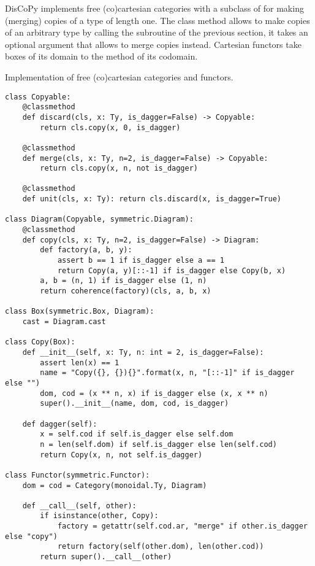 DisCoPy implements free (co)cartesian categories with a subclass of  for making (merging)  copies of a type  of length one.
The class method  allows to make  copies of an arbitrary type  by calling the  subroutine of the previous section, it takes an optional argument  that allows to merge copies instead.
Cartesian functors take  boxes of its domain to the  method of its codomain.

\begin{python}
{\normalfont Implementation of free (co)cartesian categories and functors.}

\begin{verbatim}
class Copyable:
    @classmethod
    def discard(cls, x: Ty, is_dagger=False) -> Copyable:
        return cls.copy(x, 0, is_dagger)

    @classmethod
    def merge(cls, x: Ty, n=2, is_dagger=False) -> Copyable:
        return cls.copy(x, n, not is_dagger)

    @classmethod
    def unit(cls, x: Ty): return cls.discard(x, is_dagger=True)

class Diagram(Copyable, symmetric.Diagram):
    @classmethod
    def copy(cls, x: Ty, n=2, is_dagger=False) -> Diagram:
        def factory(a, b, y):
            assert b == 1 if is_dagger else a == 1
            return Copy(a, y)[::-1] if is_dagger else Copy(b, x)
        a, b = (n, 1) if is_dagger else (1, n)
        return coherence(factory)(cls, a, b, x)

class Box(symmetric.Box, Diagram):
    cast = Diagram.cast

class Copy(Box):
    def __init__(self, x: Ty, n: int = 2, is_dagger=False):
        assert len(x) == 1
        name = "Copy({}, {}){}".format(x, n, "[::-1]" if is_dagger else "")
        dom, cod = (x ** n, x) if is_dagger else (x, x ** n)
        super().__init__(name, dom, cod, is_dagger)

    def dagger(self):
        x = self.cod if self.is_dagger else self.dom
        n = len(self.dom) if self.is_dagger else len(self.cod)
        return Copy(x, n, not self.is_dagger)

class Functor(symmetric.Functor):
    dom = cod = Category(monoidal.Ty, Diagram)

    def __call__(self, other):
        if isinstance(other, Copy):
            factory = getattr(self.cod.ar, "merge" if other.is_dagger else "copy")
            return factory(self(other.dom), len(other.cod))
        return super().__call__(other)
\end{verbatim}
\end{python}

